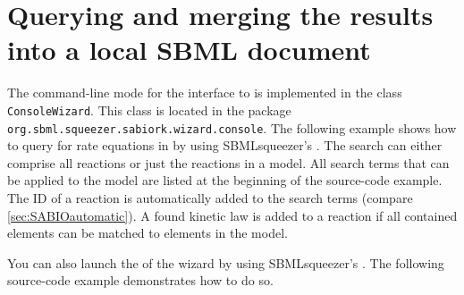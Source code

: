 \section{Querying \SABIO and merging the results into a local \acs{SBML} document}

The command-line mode for the interface to \SABIO is implemented in the class \texttt{ConsoleWizard}.
This class is located in the package \texttt{org.sbml.squeezer.sabiork.wizard.console}.
The following example shows how to query for rate equations in \SABIO by using SBMLsqueezer's \API.
The search can either comprise all reactions or just the reactions in a model.
All search terms that can be applied to the model are listed at the beginning of the source-code example.
The \KEGG \citep{Kanehisa2000a} \ac{ID} of a reaction is automatically added to the search terms (compare \vref{sec:SABIOautomatic}).
A found kinetic law is added to a reaction if all contained elements can be matched to \SBML elements in the model.


You can also launch the \GUI of the \SABIO wizard by using SBMLsqueezer's \API.
The following source-code example demonstrates how to do so.



